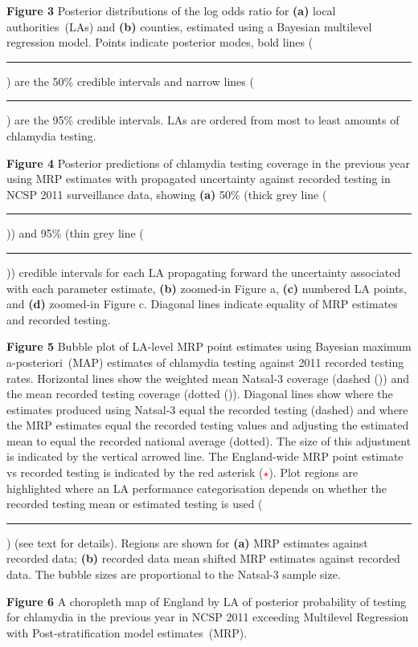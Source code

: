 \documentclass[fleqn,10pt]{wlscirep}
\begin{document}
\textbf{Figure 3} Posterior distributions of the log odds ratio for {\bf (a)} local authorities~(LAs) and {\bf (b)} counties, estimated using a Bayesian multilevel regression model. Points indicate posterior modes, bold lines (\rule[0.3ex]{0.3cm}{1.5pt}) are the 50\% credible intervals and narrow lines (\rule[0.3ex]{0.3cm}{0.5pt}) are the 95\% credible intervals. LAs are ordered from most to least amounts of chlamydia testing.

\textbf{Figure 4} Posterior predictions of chlamydia testing coverage in the previous year using MRP estimates with propagated uncertainty against recorded testing in NCSP 2011 surveillance data, showing {\bf (a)} 50\% (thick grey line (\textcolor{gray}{\rule[0.3ex]{0.3cm}{1.5pt}})) and 95\% (thin grey line (\textcolor{gray}{\rule[0.3ex]{0.3cm}{0.5pt}})) credible intervals for each LA propagating forward the uncertainty associated with each parameter estimate, {\bf (b)} zoomed-in Figure a, {\bf (c)} numbered LA points, and {\bf (d)} zoomed-in Figure c. Diagonal lines indicate equality of MRP estimates and recorded testing.

\textbf{Figure 5} Bubble plot of LA-level MRP point estimates using Bayesian maximum a-posteriori~(MAP) estimates of chlamydia testing against 2011 recorded testing rates. Horizontal lines show the weighted mean Natsal-3 coverage (dashed (\hdashrule{7mm}{0.5pt}{1.0mm})) and the mean recorded testing coverage (dotted (\hdashrule{5mm}{0.5pt}{0.5mm})). Diagonal lines show where the estimates produced using Natsal-3 equal the recorded testing (dashed) and where the MRP estimates equal the recorded testing values and adjusting the estimated mean to equal the recorded national average (dotted). The size of this adjustment is indicated by the vertical arrowed line. The England-wide MRP point estimate vs recorded testing is indicated by the red asterisk (\textcolor{red}{$\star$}). Plot regions are highlighted where an LA performance categorisation depends on whether the recorded testing mean or estimated testing is used (\textcolor{Mycolor2}{\rule{3mm}{2.5mm}}) (see text for details). Regions are shown for {\bf (a)} MRP estimates against recorded data; {\bf (b)} recorded data mean shifted MRP estimates against recorded data. The bubble sizes are proportional to the Natsal-3 sample size.

\textbf{Figure 6} A choropleth map of England by LA of posterior probability of testing for chlamydia in the previous year in NCSP 2011 exceeding Multilevel Regression with Post-stratification model estimates~(MRP).
\end{document}
